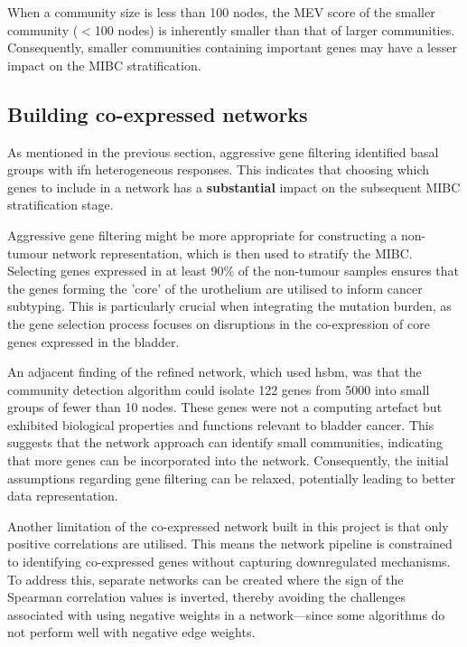 When a community size is less than 100 nodes, the MEV score of the smaller community (\(<\)100 nodes) is inherently smaller than that of larger communities. Consequently, smaller communities containing important genes may have a lesser impact on the MIBC stratification.


\subsection*{Building co-expressed networks}

As mentioned in the previous section, aggressive gene filtering identified basal groups with \acrshort{ifn} heterogeneous responses. This indicates that choosing which genes to include in a network has a \textbf{substantial} impact on the subsequent MIBC stratification stage.

Aggressive gene filtering might be more appropriate for constructing a non-tumour network representation, which is then used to stratify the MIBC. Selecting genes expressed in at least 90\% of the non-tumour samples ensures that the genes forming the 'core' of the urothelium are utilised to inform cancer subtyping. This is particularly crucial when integrating the mutation burden, as the gene selection process focuses on disruptions in the co-expression of core genes expressed in the bladder.

An adjacent finding of the refined network, which used \acrshort{hsbm}, was that the community detection algorithm could isolate 122 genes from 5000 into small groups of fewer than 10 nodes. These genes were not a computing artefact but exhibited biological properties and functions relevant to bladder cancer. This suggests that the network approach can identify small communities, indicating that more genes can be incorporated into the network. Consequently, the initial assumptions regarding gene filtering can be relaxed, potentially leading to better data representation.

Another limitation of the co-expressed network built in this project is that only positive correlations are utilised. This means the network pipeline is constrained to identifying co-expressed genes without capturing downregulated mechanisms. To address this, separate networks can be created where the sign of the Spearman correlation values is inverted, thereby avoiding the challenges associated with using negative weights in a network—since some algorithms do not perform well with negative edge weights.


